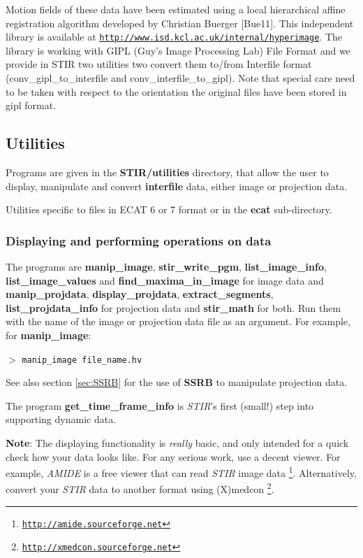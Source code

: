 \documentclass{article}
\def\url#1#2{\mbox{\href{#1}{\tt #2}}}
\newcommand{\cmdline}[1]{\par \noindent $>$ \texttt{#1}\par}
\begin{document}
{Motion fields of these data have been estimated using a local hierarchical affine
registration algorithm developed by Christian Buerger [Bue11]. This independent
library is available at
\url{http://www.isd.kcl.ac.uk/internal/hyperimage}{http://www.isd.kcl.ac.uk/internal/hyperimage}. 
The library is working with GIPL (Guy's Image Processing Lab) File Format and we provide in STIR two utilities two convert
them to/from Interfile format (conv\_gipl\_to\_interfile and
conv\_interfile\_to\_gipl). Note that special care need to be taken with respect
to the orientation the original files have been stored in gipl format. 


\subsection{
Utilities}

Programs are given in the \textbf{STIR/utilities} directory, that 
allow the user to display, manipulate and convert \textbf{interfile} 
data, either image or projection data.

Utilities specific to files in ECAT 6 or 7 format or in the \textbf{ecat}
sub-directory.

\subsubsection{
Displaying and performing operations on data}

The programs are \textbf{manip\_image}, \textbf{stir\_write\_pgm}, \textbf{list\_image\_info}, 
\textbf{list\_image\_values} and \textbf{find\_maxima\_in\_image}
for image data and \textbf{manip\_projdata}, 
 \textbf{display\_projdata}, \textbf{extract\_segments}, 
\textbf{list\_projdata\_info} for 
projection data and \textbf{stir\_math} for both. Run them with the 
name of the image or projection data file as an argument. For 
example, for \textbf{manip\_image}:
\cmdline{manip\_image file\_name.hv}


See also section \ref{sec:SSRB} for the use of \textbf{SSRB} to manipulate projection 
data.


The program \textbf{get\_time\_frame\_info} is \textit{STIR}'s first (small!) 
step into supporting dynamic data.


\textbf{Note}: The displaying functionality is \textit{really} basic, and 
only intended for a quick check how your data looks like. For 
any serious work, use a decent viewer. For example, \textit{AMIDE} 
is a free viewer that can read \textit{STIR} image data
\footnote{\url{http://amide.sourceforge.net }{http://amide.sourceforge.net}}. Alternatively, 
convert your \textit{STIR} data to another format using (X)medcon
\footnote{\url{http://xmedcon.sourceforge.net }{http://xmedcon.sourceforge.net}}.

}
\end{document}
